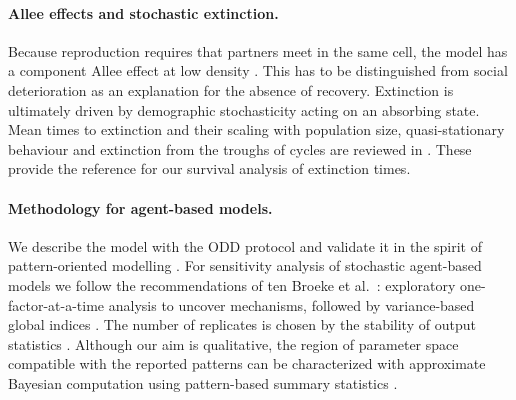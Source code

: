 \paragraph{Allee effects and stochastic extinction.}
Because reproduction requires that partners meet in the same cell, the model has a component Allee effect at low
density \cite{StephensSutherland1999,Courchamp2008}.
This has to be distinguished from social deterioration as an explanation for the absence of recovery.
Extinction is ultimately driven by demographic stochasticity acting on an absorbing state.
Mean times to extinction and their scaling with population size, quasi-stationary behaviour and extinction from the
troughs of cycles are reviewed in \cite{Ovaskainen2010}.
These provide the reference for our survival analysis of extinction times.

\paragraph{Methodology for agent-based models.}
We describe the model with the ODD protocol \cite{Grimm2020} and validate it in the spirit of pattern-oriented
modelling \cite{Grimm2005}.
For sensitivity analysis of stochastic agent-based models we follow the recommendations of ten Broeke et al.\
\cite{tenBroeke2016}: exploratory one-factor-at-a-time analysis to uncover mechanisms, followed by variance-based
global indices \cite{Saltelli2010}.
The number of replicates is chosen by the stability of output statistics \cite{Lorscheid2012}.
Although our aim is qualitative, the region of parameter space compatible with the reported patterns can be
characterized with approximate Bayesian computation using pattern-based summary statistics
\cite{Hartig2011,vanderVaart2015}.
